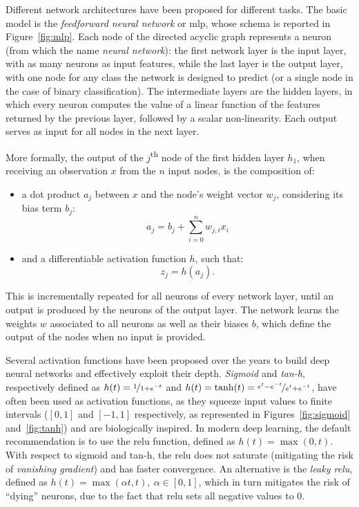 \documentclass[%
    corpo=12pt,
    twoside,
    stile=classica,   
    tipotesi=magistrale,
    evenboxes,
    english,
	numerazioneromana,
]{toptesi}
\newcommand{\quotes}[1]{``#1''}
\begin{document}
\medskip
Different network architectures have been proposed for different tasks. The basic model is the \textit{feedforward neural network} or \gls{mlp}, whose schema is reported in Figure~\ref{fig:mlp}. Each node of the directed acyclic graph represents a neuron (from which the name \textit{neural network}): the first network layer is the input layer, with as many neurons as input features, while the last layer is the output layer, with one node for any class the network is designed to predict (or a single node in the case of binary classification). The intermediate layers are the hidden layers, in which every neuron computes the value of a linear function of the features returned by the previous layer, followed by a scalar non-linearity. Each output serves as input for all nodes in the next layer.

\bigskip
More formally, the output of the $j$\textsuperscript{th} node of the first hidden layer $h_1$, when receiving an observation $x$ from the $n$ input nodes, is the composition of:
\begin{itemize}
	\item a dot product $a_j$ between $x$ and the node's weight vector $w_j$, considering its bias term $b_j$:
	\begin{equation*}
		a_j = b_j + \sum_{i=0}^n w_{j,i}x_i
	\end{equation*}
	\item and a differentiable activation function $h$, such that:
	\begin{equation*}
		z_j = h(a_j)\text{.}
	\end{equation*}
\end{itemize}
This is incrementally repeated for all neurons of every network layer, until an output is produced by the neurons of the output layer. The network learns the weights $w$ associated to all neurons as well as their biases $b$, which define the output of the nodes when no input is provided\cite{amini2015apprentissage}.

\bigskip
Several activation functions have been proposed over the years to build deep neural networks and effectively exploit their depth. \textit{Sigmoid} and \textit{tan-h}, respectively defined as $h(t) = \nicefrac{1}{1 + e^{-t}}$ and $h(t) = \tanh(t) = \nicefrac{e^t - e^{-t}}{e^t + e^{-t}}$, have often been used as activation functions, as they squeeze input values to finite intervals ($[0,1]$ and $[-1,1]$ respectively, as represented in Figures~\ref{fig:sigmoid} and~\ref{fig:tanh}) and are biologically inspired. In modern deep learning, the default recommendation is to use the \gls{relu} function, defined as $h(t) = \max(0,t)$. With respect to sigmoid and tan-h, the \gls{relu} does not saturate (mitigating the risk of \textit{vanishing gradient}) and has faster convergence. An alternative is the \textit{leaky \gls{relu}}, defined as $h(t) = \max(\alpha t, t),\ \alpha \in [0,1]$, which in turn mitigates the risk of \quotes{dying} neurons, due to the fact that \gls{relu} sets all negative values to $0$.
\end{document}
